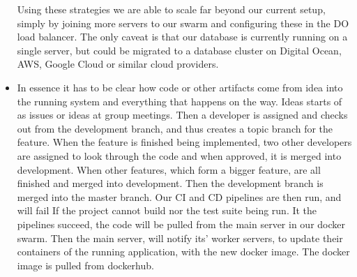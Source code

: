 \begin{itemize}
  \newline
  \newline
  \newline
  Using these strategies we are able to scale far beyond our current setup, simply by joining more servers to our swarm and configuring these in the DO load balancer.\newline
  The only caveat is that our database is currently running on a single server, but could be migrated to a database cluster on Digital Ocean, AWS, Google Cloud or similar cloud providers.
  \item In essence it has to be clear how code or other artifacts come from idea into the running system and everything that happens on the way.
        Ideas starts of as issues or ideas at group meetings.
        Then a developer is assigned and checks out from the development branch,
        and thus creates a topic branch for the feature.
        When the feature is finished being implemented, 
        two other developers are assigned to look through
        the code and when approved, it is merged into development.
        When other features, which form a bigger feature, are all finished and merged into development.
        Then the development branch is merged into the master branch.
        Our CI and CD pipelines are then run, and will fail 
        If the project cannot build nor the test suite being run.
        It the pipelines succeed, the code will be pulled from 
        the main server in our docker swarm.
        Then the main server, will notify its' worker servers,
        to update their containers of the running application,
        with the new docker image. The docker image is pulled from dockerhub.
        
  
\end{itemize}